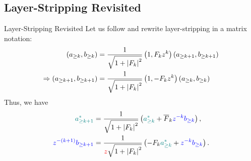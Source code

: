 \subsection{Layer-Stripping Revisited}
\begin{frame}{Layer-Stripping Revisited}
    Let us follow \cite{Lin2025} and rewrite layer-stripping in a matrix notation:
    \begin{align*}
        \left(a_{\ge k},b_{\ge k}\right) &= \frac{1}{\sqrt{1+\left|{F_k}\right|^2}} \left(1,F_kz^k\right) \left(a_{\ge k+1},b_{\ge k+1}\right) \\
        \Rightarrow \left(a_{\ge k+1},b_{\ge k+1}\right) &= \frac{1}{\sqrt{1+\left|{F_k}\right|^2}} \left(1,-F_kz^k\right) \left(a_{\ge k},b_{\ge k}\right)
    \end{align*}
    Thus, we have
    \begin{align}
        {\color{teal} a_{\ge k+1}^*} &= \frac{1}{\sqrt{1+\left|{F_k}\right|^2}} \left({\color{teal} a_{\ge k}^*} + \overline{F}_k {\color{blue} z^{-k}b_{\ge k}}\right), \\
        {\color{blue} z^{-(k+1)}b_{\ge k+1}} &= \frac{1}{{\color{red}z}\sqrt{1+\left|{F_k}\right|^2}} \left(-F_k {\color{teal} a_{\ge k}^*} + {\color{blue} z^{-k}b_{\ge k}}\right).
    \end{align}
\end{frame}
